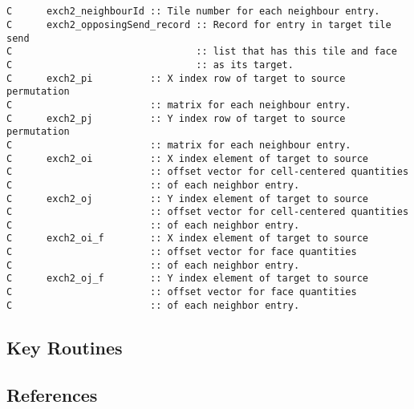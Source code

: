 \begin{verbatim}


C      exch2_neighbourId :: Tile number for each neighbour entry.        
C      exch2_opposingSend_record :: Record for entry in target tile send 
C                                :: list that has this tile and face     
C                                :: as its target.                       
C      exch2_pi          :: X index row of target to source permutation 
C                        :: matrix for each neighbour entry.            
C      exch2_pj          :: Y index row of target to source permutation 
C                        :: matrix for each neighbour entry.            
C      exch2_oi          :: X index element of target to source 
C                        :: offset vector for cell-centered quantities  
C                        :: of each neighbor entry.                     
C      exch2_oj          :: Y index element of target to source 
C                        :: offset vector for cell-centered quantities  
C                        :: of each neighbor entry.                     
C      exch2_oi_f        :: X index element of target to source 
C                        :: offset vector for face quantities           
C                        :: of each neighbor entry.                     
C      exch2_oj_f        :: Y index element of target to source 
C                        :: offset vector for face quantities           
C                        :: of each neighbor entry.                     
\end{verbatim}




\subsection{Key Routines}



\subsection{References}
